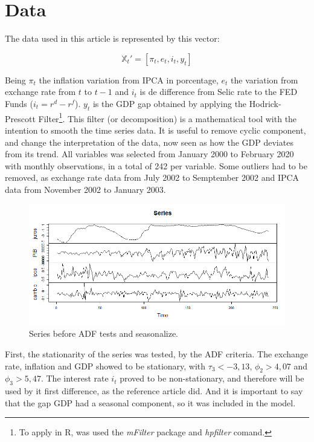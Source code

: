 \documentclass[hidelinks,12pt]{article}
\begin{document}
	
	\section{Data}

The data used in this article is represented by this vector:

\begin{displaymath}
	\mathbb{X}_t' = [\pi_t, e_t, i_t, y_t ]
\end{displaymath}

Being $\pi_t$ the inflation variation from IPCA in porcentage, $e_t$ the variation  from exchange rate from $t$ to $t-1$ and $i_t$ is de difference from Selic rate to the FED Funds ($i_t = r^d - r^f$). $y_t$ is the GDP gap obtained by applying the Hodrick-Prescott Filter\footnote{To apply in R, was used the \textit{mFilter} package and \textit{hpfilter} comand.}. This filter (or decomposition) is a mathematical tool with the intention to smooth the time series data. It is useful to remove cyclic component, and change the interpretation of the data, now seen  as how the GDP deviates from its trend. All variables was selected from January 2000 to February 2020 with monthly observations, in a total of 242 per variable. Some outliers had to be removed, as exchange rate data from July 2002 to Semptember 2002 and IPCA data from November 2002 to January 2003.\\



	\begin{figure}[H]
		\centering
		\includegraphics[width=1.0\linewidth]{Rplot}
		\caption{Series before ADF tests and seasonalize.}
		\label{fig:rplot}
	\end{figure}

First, the stationarity of the series was tested, by the ADF criteria. The exchange rate, inflation and GDP showed to be stationary, with $\tau_3 < -3,13$, $\phi_2 > 4,07$ and $\phi_3 > 5,47$. The interest rate $i_t$ proved to be non-stationary, and therefore will be used by it first difference, as the reference article did. And it is important to say that the gap GDP had a seasonal component, so it was included in the model.
\end{document}
